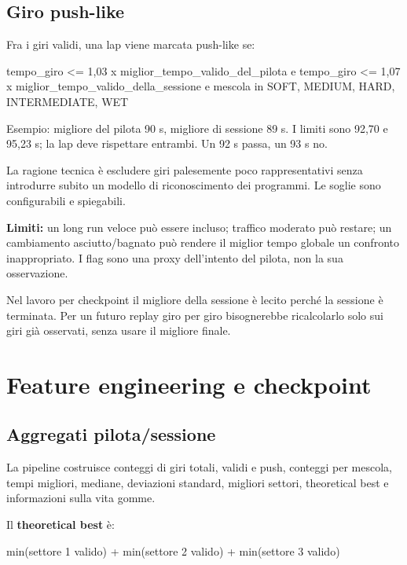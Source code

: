 \documentclass[11pt,a4paper]{article}
\begin{document}
\subsection{Giro push-like}\label{giro-push-like}

Fra i giri validi, una lap viene marcata push-like se:

\begin{CodeBlock}
tempo_giro <= 1,03 x miglior_tempo_valido_del_pilota
e
tempo_giro <= 1,07 x miglior_tempo_valido_della_sessione
e
mescola in {SOFT, MEDIUM, HARD, INTERMEDIATE, WET}
\end{CodeBlock}

Esempio: migliore del pilota 90 s, migliore di sessione 89 s. I limiti sono 92,70 e 95,23 s; la lap deve rispettare entrambi. Un 92 s passa, un 93 s no.

La ragione tecnica è escludere giri palesemente poco rappresentativi senza introdurre subito un modello di riconoscimento dei programmi. Le soglie sono configurabili e spiegabili.

\textbf{Limiti:} un long run veloce può essere incluso; traffico moderato può restare; un cambiamento asciutto/bagnato può rendere il miglior tempo globale un confronto inappropriato. I flag sono una proxy dell'intento del pilota, non la sua osservazione.

Nel lavoro per checkpoint il migliore della sessione è lecito perché la sessione è terminata. Per un futuro replay giro per giro bisognerebbe ricalcolarlo solo sui giri già osservati, senza usare il migliore finale.

\section{Feature engineering e checkpoint}\label{feature-engineering-e-checkpoint}

\subsection{Aggregati pilota/sessione}\label{aggregati-pilotasessione}

La pipeline costruisce conteggi di giri totali, validi e push, conteggi per mescola, tempi migliori, mediane, deviazioni standard, migliori settori, theoretical best e informazioni sulla vita gomme.

Il \textbf{theoretical best} è:

\begin{CodeBlock}
min(settore 1 valido) + min(settore 2 valido) + min(settore 3 valido)
\end{CodeBlock}
\end{document}
